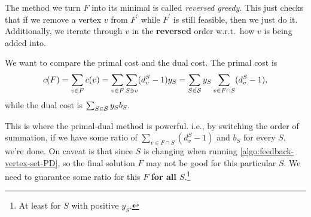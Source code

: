 \begin{remark}\label{rmk:reversed-greedy}
	The method we turn \(F\) into its minimal is called \emph{reversed greedy}. This just checks that if we remove a vertex \(v\) from \(F^\prime \) while \(F^\prime \) is still feasible, then we just do it. Additionally, we iterate through \(v\) in the \textbf{reversed} order w.r.t.\ how \(v\) is being added into.
\end{remark}

We want to compare the primal cost and the dual cost. The primal cost is
\[
	c(F) = \sum_{v\in F}c(v) = \sum_{v\in F}\sum_{S\ni v} (d_{v} ^S - 1) y_S = \sum_{S\in \mathcal{\MakeUppercase{S}}}y_S \sum_{v\in F \cap S}(d_{v} ^S - 1),
\]
while the dual cost is \(\sum_{S\in \mathcal{\MakeUppercase{S}} }y_S b_S\).

\begin{remark}
	This is where the primal-dual method is powerful. i.e., by switching the order of summation, if we have some ratio of \(\sum_{v\in F \cap S}(d_{v} ^S - 1)\) and \(b_S\) for every \(S\), we're done. On caveat is that since \(S\) is changing when running \autoref{algo:feedback-vertex-set-PD}, so the final solution \(F\) may not be good for this particular \(S\). We need to guarantee some ratio for this \(F\) \textbf{for all \(S\)}.\footnote{At least for \(S\) with positive \(y_S\).}
\end{remark}

